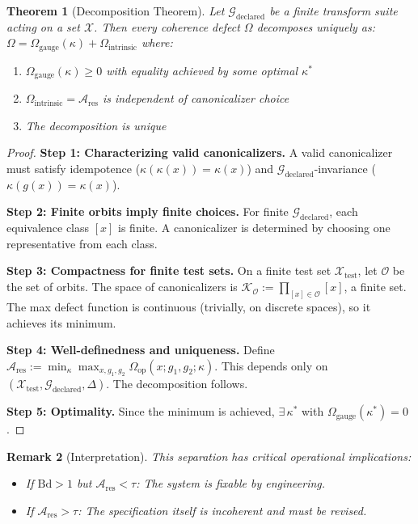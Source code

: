 \documentclass[12pt]{article}
\newtheorem{theorem}{Theorem}
\newtheorem{remark}[theorem]{Remark}
\begin{document}
\begin{theorem}[Decomposition Theorem]
\emph{Let $\mathcal{G}_{\mathrm{declared}}$ be a finite transform suite acting on a set $\mathcal{X}$. Then every coherence defect $\Omega$ decomposes uniquely as:} $\Omega = \Omega_{\mathrm{gauge}}(\kappa) + \Omega_{\mathrm{intrinsic}}$ \emph{where:}
\begin{enumerate}
    \item $\Omega_{\mathrm{gauge}}(\kappa) \geq 0$ \emph{with equality achieved by some optimal $\kappa^*$}
    \item $\Omega_{\mathrm{intrinsic}} = \mathcal{A}_{\mathrm{res}}$ \emph{is independent of canonicalizer choice}
    \item \emph{The decomposition is unique}
\end{enumerate}
\end{theorem}

\begin{proof}
\textbf{Step 1: Characterizing valid canonicalizers.} A valid canonicalizer must satisfy idempotence ($\kappa(\kappa(x)) = \kappa(x)$) and $\mathcal{G}_{\mathrm{declared}}$-invariance ($\kappa(g(x)) = \kappa(x)$).

\textbf{Step 2: Finite orbits imply finite choices.} For finite $\mathcal{G}_{\mathrm{declared}}$, each equivalence class $[x]$ is finite. A canonicalizer is determined by choosing one representative from each class.

\textbf{Step 3: Compactness for finite test sets.} On a finite test set $\mathcal{X}_{\mathrm{test}}$, let $\mathcal{O}$ be the set of orbits. The space of canonicalizers is $\mathcal{K}_{\mathcal{O}} := \prod_{[x] \in \mathcal{O}} [x]$, a finite set. The max defect function is continuous (trivially, on discrete spaces), so it achieves its minimum.

\textbf{Step 4: Well-definedness and uniqueness.} Define $\mathcal{A}_{\mathrm{res}} := \min_\kappa \max_{x, g_1, g_2} \Omega_{\mathrm{op}}(x; g_1, g_2; \kappa)$. This depends only on $(\mathcal{X}_{\mathrm{test}}, \mathcal{G}_{\mathrm{declared}}, \Delta)$. The decomposition follows.

\textbf{Step 5: Optimality.} Since the minimum is achieved, $\exists\,\kappa^*$ with $\Omega_{\mathrm{gauge}}(\kappa^*) = 0$. \qedhere
\end{proof}

\begin{remark}[Interpretation]
\emph{This separation has critical operational implications:}
\begin{itemize}
    \item \emph{If $\mathrm{Bd} > 1$ but $\mathcal{A}_{\mathrm{res}} < \tau$: The system is fixable by engineering.}
    \item \emph{If $\mathcal{A}_{\mathrm{res}} > \tau$: The specification itself is incoherent and must be revised.}
\end{itemize}
\end{remark}
\end{document}
